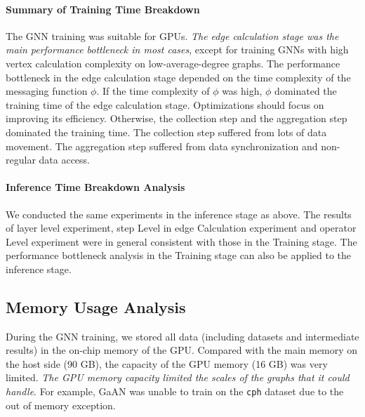 \paragraph{Summary of Training Time Breakdown}
%
The GNN training was suitable for GPUs.
%
\emph{The edge calculation stage was the main performance bottleneck in most cases}, except for training GNNs with high vertex calculation complexity on low-average-degree graphs.
%
The performance bottleneck in the edge calculation stage depended on the time complexity of the messaging function $\phi$.
%
If the time complexity of $\phi$ was {high}, {$\phi$} dominated the training time of the edge calculation stage.
%
Optimizations should focus on improving its efficiency.
%
Otherwise, the {collection step} and the {aggregation step} dominated the training time.
%
The collection step suffered from lots of data movement.
%
The aggregation step suffered from data synchronization and non-regular data access.

\paragraph{Inference Time Breakdown Analysis}
We conducted the same experiments in the inference stage as above.
%
The results of layer level experiment, step Level in edge Calculation experiment and operator Level experiment were in general consistent with those in the Training stage.
%
The performance bottleneck analysis in the Training stage can also be applied to the inference stage.

\subsection{Memory Usage Analysis}
\label{sec:memory_usage_analysis}

During the GNN training, we stored all data (including datasets and intermediate results) in the on-chip memory of the GPU.
%
Compared with the main memory on the host side (90 GB), the capacity of the GPU memory (16 GB) was very limited.
%
\emph{The GPU memory capacity limited the scales of the graphs that it could handle}.
%
For example, GaAN was unable to train on the \texttt{cph} dataset due to the out of memory exception.

